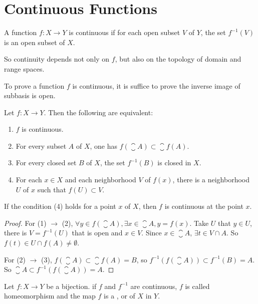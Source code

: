 \section{Continuous Functions}


\begin{definition}
    A function $f: X \rightarrow Y$ is continuous if for each open subset $V$ of $Y$, the set $f^{-1}(V)$ is an open subset of $X$.
    
    So continuity depends not only on $f$, but also on the topology of domain and range spaces.
\end{definition}

To prove a function $f$ is continuous, it is suffice to prove the inverse image of subbasis is open.

\begin{theorem}
Let $f: X \rightarrow Y$. Then the following are equivalent:
\begin{enumerate}
    \item $f$ is continuous.
    \item For every subset $A$ of $X$, one has $f(\closure{A}) \subset \closure{f(A)}$.
    \item For every closed set $B$ of $X$, the set $f^{-1}(B)$ is closed in $X$.
    \item For each $x\in X$ and each neighborhood $V$ of $f(x)$, there is a neighborhood $U$ of $x$ such that $f(U) \subset V$.
\end{enumerate}    

If the condition (4) holds for a point $x$ of $X$, then $f$ is continuous at the point $x$.
\end{theorem}
\begin{proof}
    For (1) $\rightarrow$ (2), $\forall y \in f(\closure{A}), \exists x \in \closure{A}, y = f(x)$. Take $U$ that $y \in U$, there is $V = f^{-1}(U)$ that is open and $x \in V$. Since $x \in \closure{A}$, $\exists t \in V \cap A$. So $f(t) \in U \cap f(A) \neq \emptyset$.
    
    For (2) $\rightarrow$ (3), $f(\closure{A}) \subset \closure{f(A)} = B$, so $f^{-1} \left(f(\closure{A}) \right) \subset f^{-1}(B) = A$. So $\closure{A} \subset f^{-1} \left(f(\closure{A}) \right) = A$.
\end{proof}


\begin{definition}
    Let $f:X \rightarrow Y$ be a bijection. if $f$ and $f^{-1}$ are continuous, $f$ is called homeomorphism and the map $f$ is a , or  of $X$ in $Y$.
\end{definition}


